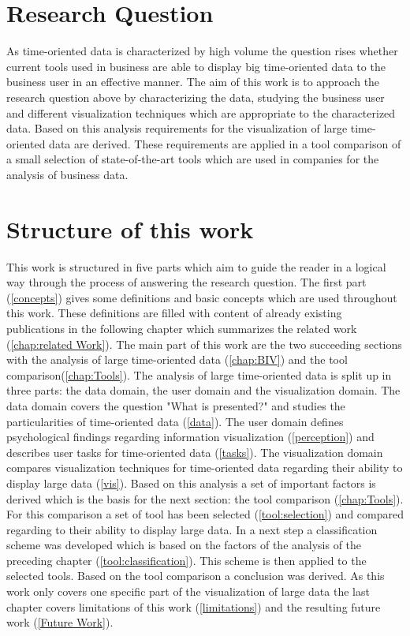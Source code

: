 \section{Research Question}
As time-oriented data is characterized by high volume the question rises whether current tools used in business are able to display big time-oriented data to the business user in an effective manner. The aim of this work is to approach the research question above by characterizing the data, studying the business user and different visualization techniques which are appropriate to the characterized data. Based on this analysis requirements for the visualization of large time-oriented data are derived. These requirements are applied in a tool comparison of a small selection of state-of-the-art tools which are used in companies for the analysis of business data.


\section{Structure of this work}
This work is structured in five parts which aim to guide the reader in a logical way through the process of answering the research question. The first part (\ref{concepts}) gives some definitions and basic concepts which are used throughout this work. These definitions are filled with content of already existing publications in the following chapter which summarizes the related work (\ref{chap:related Work}). The main part of this work are the two succeeding sections with the analysis of large time-oriented data (\ref{chap:BIV}) and the tool comparison(\ref{chap:Tools}). The analysis of large time-oriented data is split up in three parts: the data domain, the user domain and the visualization domain. The data domain covers the question "What is presented?" and studies the particularities of time-oriented data (\ref{data}). The user domain defines psychological findings regarding information visualization  (\ref{perception}) and describes user tasks for time-oriented data (\ref{tasks}). The visualization domain compares visualization techniques for time-oriented data regarding their ability to display large data (\ref{vis}). Based on this analysis a set of important factors is derived which is the basis for the next section: the tool comparison (\ref{chap:Tools}). For this comparison a set of tool has been selected (\ref{tool:selection}) and compared regarding to their ability to display large data. In a next step a  classification scheme was developed which is based on the factors of the analysis of the preceding chapter (\ref{tool:classification}). This scheme is then applied to the selected tools.
Based on the tool comparison a conclusion was derived.
As this work only covers one specific part of the visualization of large data the last chapter covers limitations of this work (\ref{limitations}) and the resulting future work (\ref{Future Work}).
